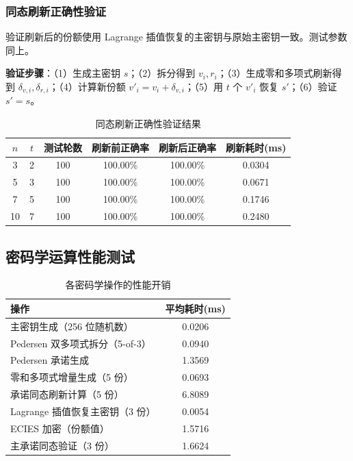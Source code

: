 \subsubsection{同态刷新正确性验证}

验证刷新后的份额使用 Lagrange 插值恢复的主密钥与原始主密钥一致。测试参数同上。

\textbf{验证步骤}：（1）生成主密钥 $s$；（2）拆分得到 $v_i, r_i$；（3）生成零和多项式刷新得到 $\delta_{v,i}, \delta_{r,i}$；（4）计算新份额 $v'_i = v_i + \delta_{v,i}$；（5）用 $t$ 个 $v'_i$ 恢复 $s'$；（6）验证 $s' = s$。

\begin{table}[H]
    \centering
    \caption{同态刷新正确性验证结果}
    \label{tab:refresh_test}
    \begin{tabularx}{\textwidth}{cccccc}
        \toprule
        $n$ & $t$ & 测试轮数 & 刷新前正确率 & 刷新后正确率 & 刷新耗时(ms) \\
        \midrule
        3 & 2 & 100 & 100.00\% & 100.00\% & 0.0304 \\
        5 & 3 & 100 & 100.00\% & 100.00\% & 0.0671 \\
        7 & 5 & 100 & 100.00\% & 100.00\% & 0.1746 \\
        10 & 7 & 100 & 100.00\% & 100.00\% & 0.2480 \\
        \bottomrule
    \end{tabularx}
\end{table}

\subsection{密码学运算性能测试}

\begin{table}[H]
    \centering
    \caption{各密码学操作的性能开销}
    \label{tab:perf}
    \begin{tabularx}{\textwidth}{lc}
        \toprule
        \textbf{操作} & \textbf{平均耗时(ms)} \\
        \midrule
        主密钥生成（256 位随机数） & 0.0206 \\
        Pedersen 双多项式拆分（5-of-3） & 0.0940 \\
        Pedersen 承诺生成 & 1.3569 \\
        零和多项式增量生成（5 份） & 0.0693 \\
        承诺同态刷新计算（5 份） & 6.8089 \\
        Lagrange 插值恢复主密钥（3 份） & 0.0054 \\
        ECIES 加密（份额值） & 1.5716 \\
        主承诺同态验证（3 份） & 1.6624 \\
        \bottomrule
    \end{tabularx}
\end{table}

